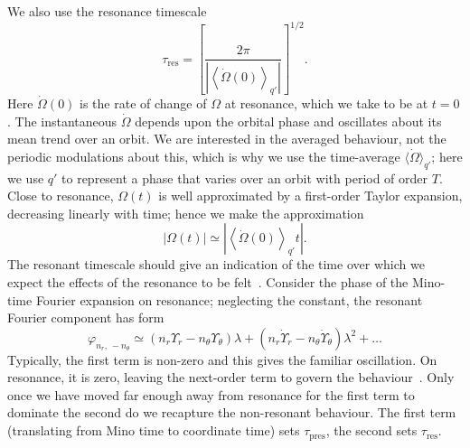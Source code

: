 \documentclass[aps,prd,amsfonts,amssymb,amsmath,nofootinbib,showpacs,superscriptaddress,twocolumn]{revtex4}
\newcommand{\sub}[1]{\ensuremath{_\mathrm{#1}}}
\begin{document}
We also use the resonance timescale
\begin{equation}
\tau\sub{res} = \left[\frac{2\pi}{\left|\left\langle\dot{\Omega}(0)\right\rangle_{q'}\right|}\right]^{1/2}.
\label{eq:t-res}
\end{equation}
Here $\dot{\Omega}(0)$ is the rate of change of $\Omega$ at resonance, which we take to be at $t = 0$. The instantaneous $\dot{\Omega}$ depends upon the orbital phase and oscillates about its mean trend over an orbit. We are interested in the averaged behaviour, not the periodic modulations about this, which is why we use the time-average $\langle\dot{\Omega}\rangle_{q'}$; here we use $q'$ to represent a phase that varies over an orbit with period of order $T$. Close to resonance, $\Omega(t)$ is well approximated by a first-order Taylor expansion, decreasing linearly with time; hence we make the approximation
\begin{equation}
\left|{\Omega(t)}\right| \simeq \left|\left\langle\dot{\Omega}(0)\right\rangle_{q'} t\right|.
\label{eq:Taylor-Omega}
\end{equation}
The resonant timescale should give an indication of the time over which we expect the effects of the resonance to be felt~\cite{Bosley1992}. Consider the phase of the Mino-time Fourier expansion on resonance; neglecting the constant, the resonant Fourier component has form
\begin{equation}
\varphi_{n_r,\,-n_\theta} \simeq \left(n_r\Upsilon_r - n_\theta\Upsilon_\theta\right)\lambda + \left(n_r\dot{\Upsilon}_r - n_\theta\dot{\Upsilon}_\theta\right)\lambda^2 + \ldots
\end{equation}
Typically, the first term is non-zero and this gives the familiar oscillation. On resonance, it is zero, leaving the next-order term to govern the behaviour~\cite{Flanagan2012}. Only once we have moved far enough away from resonance for the first term to dominate the second do we recapture the non-resonant behaviour. The first term (translating from Mino time to coordinate time) sets $\tau\sub{pres}$, the second sets $\tau\sub{res}$.
\end{document}
